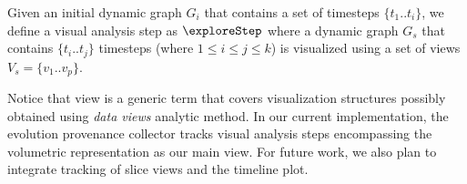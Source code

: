 \begin{definition} 
Given an initial dynamic graph $G_i$ that contains a set of timesteps $\{t_1..t_i\}$, we define a visual analysis step as $\exploreStep$ where a dynamic graph $G_s$  that contains $\{t_i..t_j\}$ timesteps  (where $1 \leq i \leq j \leq k $) is visualized using a set of views $V_s=\{v_1..v_p\}$.
\end{definition}


Notice that view is a generic term that covers visualization structures possibly obtained using \emph{data views} analytic method.
In our current implementation, the evolution provenance collector tracks visual analysis steps encompassing the volumetric representation as our main view.
For future work, we also plan to integrate tracking of slice views and the timeline plot.




